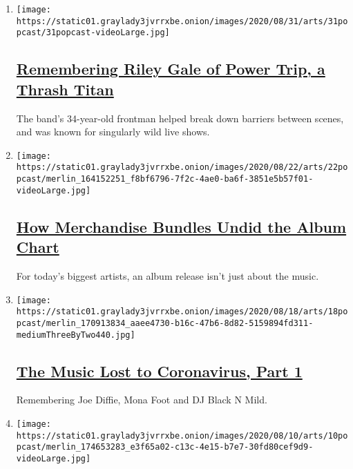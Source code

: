 \begin{enumerate}
\def\labelenumi{\arabic{enumi}.}
\item
  \texttt{[image: https://static01.graylady3jvrrxbe.onion/images/2020/08/31/arts/31popcast/31popcast-videoLarge.jpg]}

  \hypertarget{remembering-riley-gale-of-power-trip-a-thrash-titan}{%
  \subsection{\texorpdfstring{\href{/2020/09/01/arts/music/popcast-riley-gale-power-trip.html}{Remembering
  Riley Gale of Power Trip, a Thrash
  Titan}}{Remembering Riley Gale of Power Trip, a Thrash Titan}}\label{remembering-riley-gale-of-power-trip-a-thrash-titan}}

  The band's 34-year-old frontman helped break down barriers between
  scenes, and was known for singularly wild live shows.
\item
  \texttt{[image: https://static01.graylady3jvrrxbe.onion/images/2020/08/22/arts/22popcast/merlin\_164152251\_f8bf6796-7f2c-4ae0-ba6f-3851e5b57f01-videoLarge.jpg]}

  \hypertarget{how-merchandise-bundles-undid-the-album-chart}{%
  \subsection{\texorpdfstring{\href{/2020/08/22/arts/music/popcast-merchandise-bundles.html}{How
  Merchandise Bundles Undid the Album
  Chart}}{How Merchandise Bundles Undid the Album Chart}}\label{how-merchandise-bundles-undid-the-album-chart}}

  For today's biggest artists, an album release isn't just about the
  music.
\item
  \texttt{[image: https://static01.graylady3jvrrxbe.onion/images/2020/08/18/arts/18popcast/merlin\_170913834\_aaee4730-b16c-47b6-8d82-5159894fd311-mediumThreeByTwo440.jpg]}

  \hypertarget{the-music-lost-to-coronavirus-part-1}{%
  \subsection{\texorpdfstring{\href{/2020/08/18/arts/music/popcast-coronavirus-deaths.html}{The
  Music Lost to Coronavirus, Part
  1}}{The Music Lost to Coronavirus, Part 1}}\label{the-music-lost-to-coronavirus-part-1}}

  Remembering Joe Diffie, Mona Foot and DJ Black N Mild.
\item
  \texttt{[image: https://static01.graylady3jvrrxbe.onion/images/2020/08/10/arts/10popcast/merlin\_174653283\_e3f65a02-c13c-4e15-b7e7-30fd80cef9d9-videoLarge.jpg]}


\end{enumerate}
